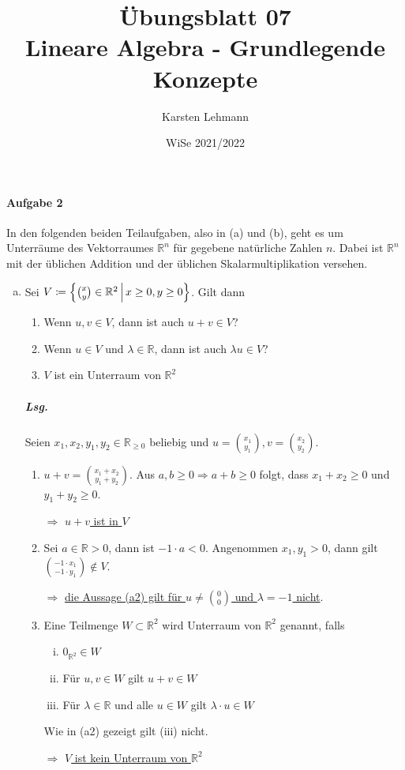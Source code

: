 \documentclass{scrreprt}
\author{Karsten Lehmann}
\date{WiSe 2021/2022}
\title{Übungsblatt 07\\Lineare Algebra - Grundlegende Konzepte}
\begin{document}
\paragraph{Aufgabe 2} In den folgenden beiden Teilaufgaben, also in (a) und (b),
geht es um Unterräume des Vektorraumes $\mathbb{R}^n$ für gegebene natürliche
Zahlen $n$.
Dabei ist $\mathbb{R}^n$ mit der üblichen Addition und der üblichen
Skalarmultiplikation versehen.

\begin{enumerate}[(a)]
\item Sei $V \coloneqq \qty{\binom{x}{y} \in \mathbb{R}^2 \,\middle|\,
    x \geq 0, y \geq 0}$.
  Gilt dann
  \begin{enumerate}[label={(a\arabic*)}]
  \item Wenn $u, v \in V$, dann ist auch $u + v \in V$?
  \item Wenn $u \in V$ und $\lambda \in \mathbb{R}$, dann ist auch
    $\lambda u \in V$?

  \item $V$ ist ein Unterraum von $\mathbb{R}^2$
  \end{enumerate}

  \subparagraph{Lsg.} Seien $x_1, x_2, y_1, y_2 \in \mathbb{R}_{\geq 0}$
  beliebig und $u = \binom{x_1}{y_1}, v = \binom{x_2}{y_2}$.
  \begin{enumerate}[label={(a\arabic*)}]
  \item $u + v = \binom{x_1 + x_2}{y_1 + y_2}$.
    Aus $a, b \geq 0 \Rightarrow a + b \geq 0$ folgt, dass $x_1 + x_2 \geq 0$
    und $y_1 + y_2 \geq 0$.

    $\Rightarrow$ \underline{$u + v$ ist in $V$}

  \item Sei $a \in \mathbb{R} > 0$, dann ist $-1 \cdot a < 0$.
    Angenommen $x_1, y_1 > 0$, dann gilt
    $\binom{-1 \cdot x_1}{-1 \cdot y_1} \notin V$.

    $\Rightarrow$ \underline{die Aussage (a2) gilt für $u \ne \binom{0}{0}$ und
      $\lambda = -1$ nicht}.

  \item Eine Teilmenge $W \subset \mathbb{R}^2$ wird Unterraum von
    $\mathbb{R}^2$ genannt, falls
    \begin{enumerate}[(i)]
    \item $0_{\mathbb{R}^2} \in W$
    \item Für $u, v \in W$ gilt $u + v \in W$
    \item Für $\lambda \in \mathbb{R}$ und alle $u \in W$ gilt
      $\lambda \cdot u \in W$
    \end{enumerate}
    Wie in (a2) gezeigt gilt (iii) nicht.

    $\Rightarrow$ \underline{$V$ ist kein Unterraum von $\mathbb{R}^2$}
  \end{enumerate}
\end{enumerate}
\end{document}
